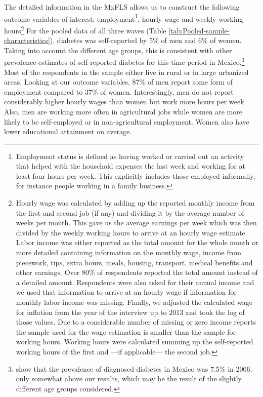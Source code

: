\documentclass[12pt,english]{article}
\begin{document}
The detailed information in the \ac{MxFLS} allows us to construct the following outcome variables of interest: employment\footnote{Employment status is defined as having worked or carried out an activity that helped with the household expenses the last week and working for at least four hours per week. This explicitly includes those employed informally, for instance people working in a family business.}, hourly wage and weekly working hours\footnote{Hourly wage was calculated by adding up the reported monthly income from the first and second job (if any) and dividing it by the average number of weeks per month. This gave us the average earnings per week which was then divided by the weekly working hours to arrive at an hourly wage estimate. Labor income was either reported as the total amount for the whole month or more detailed containing information on the monthly wage, income from piecework, tips, extra hours, meals, housing, transport, medical benefits and other earnings. Over 80\% of respondents reported the total amount instead of a detailed amount. Respondents were also asked for their annual income and we used that information to arrive at an hourly wage if information for monthly labor income was missing. Finally, we adjusted the calculated wage for inflation from the year of the interview up to 2013 and took the log of those values. Due to a considerable number of missing or zero income reports the sample used for the wage estimation is smaller than the sample for working hours. Working hours were calculated summing up the self-reported working hours of the first and ---if applicable--- the second job.} For the pooled data of all three waves (Table  \ref{tab:Pooled-sample-characteristics}), diabetes was self-reported by 5\% of men and 6\% of women. Taking into account the different age groups, this is consistent with other prevalence estimates of self-reported diabetes for this time period in Mexico.\footnote{\textcite{Barquera2013} show that the prevalence of diagnosed diabetes in Mexico was 7.5\% in 2006, only somewhat above our results, which may be the result of the slightly different age groups considered.}  Most of the respondents in the sample either live in rural or in large urbanized areas. Looking at our outcome variables, 87\% of men report some form of employment compared to 37\% of women. Interestingly, men do not report considerably higher hourly wages than women but work more hours per week. Also, men are working more often in agricultural jobs while women are more likely to be self-employed or in non-agricultural employment. Women also have lower educational attainment on average. 
\end{document}
